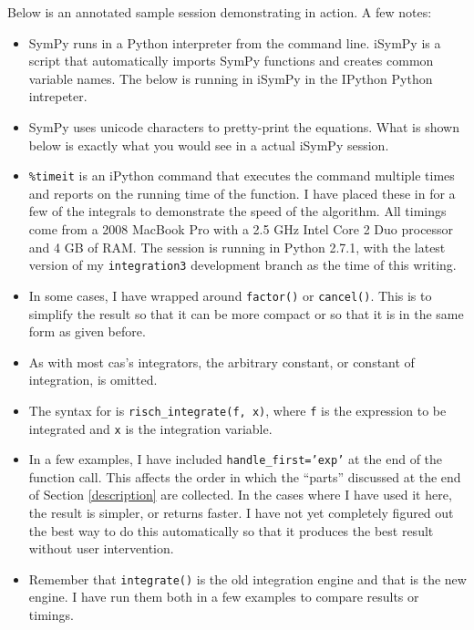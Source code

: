 Below is an annotated sample session demonstrating \rischintegrate{} in action.  A few notes:
\begin{itemize}
\item SymPy runs in a Python interpreter from the command line. iSymPy is
a script that automatically imports SymPy functions and creates common
variable names.  The below is running in iSymPy in the IPython
Python intrepeter.

\item SymPy uses unicode characters to pretty-print the equations. 
What is shown below is exactly what you would see in a actual iSymPy
session.

\item \texttt{\%timeit} is an iPython command that executes the command
multiple times and reports on the running time of the function. I have
placed these in for a few of the integrals to demonstrate the speed of
the algorithm.  All timings come from a 2008 MacBook Pro with a 2.5 GHz
Intel Core 2 Duo processor and 4 GB of RAM.  The session is running in
Python 2.7.1, with the latest version of my \texttt{integration3}
development branch as the time of this writing.  

\item In some cases, I have wrapped \rischintegrate{} around
\texttt{factor()} or \texttt{cancel()}.  This is to simplify the result
so that it can be more compact or so that it is in the same form as
given before.

\item As with most \gls{cas}'s integrators, the arbitrary constant, or
constant of \gls{integration}, is omitted.  

\item The syntax for \rischintegrate{} is \texttt{risch\_integrate(f, x)},
where \texttt{f} is the expression to be integrated and \texttt{x} is
the \gls{integration} variable.

\item In a few examples, I have included \texttt{handle\_first='exp'} at
the end of the \rischintegrate{} function call.  This affects the order in
which the ``parts'' discussed at the end of Section \ref{description}
are collected.  In the cases where I have used it here, the result is
simpler, or returns faster.  I have not yet completely figured out the
best way to do this automatically so that it produces the best result
without user intervention.  

\item Remember that \texttt{integrate()} is the old \gls{integration}
engine and that \rischintegrate{} is the new engine.  I have run them both in a
few examples to compare results or timings.  


\end{itemize}
